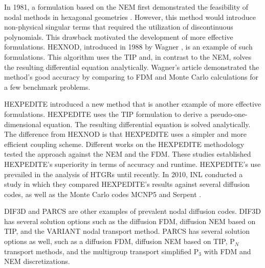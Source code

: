 In 1981, a formulation based on the \gls{NEM} first demonstrated the feasibility of nodal methods in hexagonal geometries \cite{duracz_nodal_1981}.
However, this method would introduce non-physical singular terms that required the utilization of discontinuous polynomials.
This drawback motivated the development of more effective formulations.
HEXNOD, introduced in 1988 by Wagner \cite{wagner_three-dimensional_1989}, is an example of such formulations.
This algorithm uses the \gls{TIP} and, in contrast to the \gls{NEM}, solves the resulting differential equation analytically.
Wagner's article demonstrated the method's good accuracy by comparing to \gls{FDM} and Monte Carlo calculations for a few benchmark problems.

HEXPEDITE \cite{fitzpatrick_hexpedite_1992} introduced a new method that is another example of more effective formulations.
HEXPEDITE uses the \gls{TIP} formulation to derive a pseudo-one-dimensional equation.
The resulting differential equation is solved analytically.
The difference from HEXNOD is that HEXPEDITE uses a simpler and more efficient coupling scheme.
Different works \cite{fitzpatrick_hexpedite_1992}\cite{fitzpatrick_developments_1995} on the HEXPEDITE methodology tested the approach against the \gls{NEM} and the \gls{FDM}.
These studies established HEXPEDITE’s superiority in terms of accuracy and runtime.
HEXPEDITE's use prevailed in the analysis of \glspl{HTGR} until recently.
In 2010, \gls{INL} conducted a study \cite{ortensi_deterministic_2010-1} in which they compared HEXPEDITE's results against several diffusion codes, as well as the Monte Carlo codes MCNP5 \cite{rsicc_computer_code_collection_mcnp5_2003} and Serpent \cite{leppanen_serpent_2015}.

DIF3D \cite{lawrence_dif3d_1983} and PARCS \cite{downar_parcs_2004} are other examples of prevalent nodal diffusion codes.
DIF3D has several solution options such as the diffusion \gls{FDM}, diffusion \gls{NEM} based on \gls{TIP}, and the VARIANT nodal transport method.
PARCS has several solution options as well, such as a diffusion \gls{FDM}, diffusion \gls{NEM} based on \gls{TIP}, P$_{N}$ transport methods, and the multigroup transport simplified P$_3$ with \gls{FDM} and \gls{NEM} discretizations.

